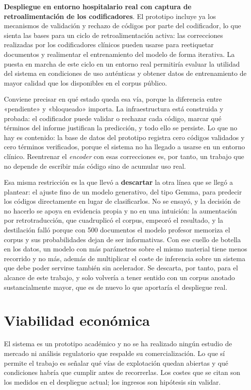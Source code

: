 \textbf{Despliegue en entorno hospitalario real con captura de retroalimentación de los codificadores}. El prototipo incluye ya los mecanismos de validación y rechazo de códigos por parte del codificador, lo que sienta las bases para un ciclo de retroalimentación activa: las correcciones realizadas por los codificadores clínicos pueden usarse para reetiquetar documentos y realimentar el entrenamiento del modelo de forma iterativa. La puesta en marcha de este ciclo en un entorno real permitiría evaluar la utilidad del sistema en condiciones de uso auténticas y obtener datos de entrenamiento de mayor calidad que los disponibles en el corpus público.

Conviene precisar en qué estado queda esa vía, porque la diferencia entre «pendiente» y «bloqueado» importa. La infraestructura está construida y probada: el codificador puede validar o rechazar cada código, marcar qué términos del informe justifican la predicción, y todo ello se persiste. Lo que no hay es contenido: la base de datos del prototipo registra cero códigos validados y cero términos verificados, porque el sistema no ha llegado a usarse en un entorno clínico. Reentrenar el \emph{encoder} con esas correcciones es, por tanto, un trabajo que no depende de escribir más código sino de acumular uso real.

Esa misma restricción es la que llevó a \textbf{descartar} la otra línea que se llegó a plantear: el ajuste fino de un modelo generativo, del tipo Gemma, para predecir los códigos directamente en lugar de clasificarlos. No se ensayó, y la decisión de no hacerlo se apoya en evidencia propia y no en una intuición: la aumentación por retrotraducción, que cuadruplicó el corpus, empeoró el resultado, y la destilación falló porque con 500 documentos el modelo profesor memoriza el corpus y sus probabilidades dejan de ser informativas. Con ese cuello de botella en los datos, un modelo con más parámetros sobre el mismo material tiene menos recorrido y no más, además de multiplicar el coste de inferencia sobre un sistema que debe poder servirse también sin acelerador. Se descarta, por tanto, para el alcance de este trabajo, y solo volvería a tener sentido con un corpus anotado sustancialmente mayor, que es de nuevo lo que aportaría el despliegue real.

\section{Viabilidad económica}

El sistema es un prototipo académico y no se ha realizado ningún estudio de mercado ni análisis regulatorio que respalde su comercialización. Lo que sí permite el trabajo es señalar qué vías de explotación quedan abiertas y qué condiciones habría que cumplir antes de recorrerlas. Los costes que se citan son los medidos en el despliegue actual; los ingresos son hipótesis sin validar.

